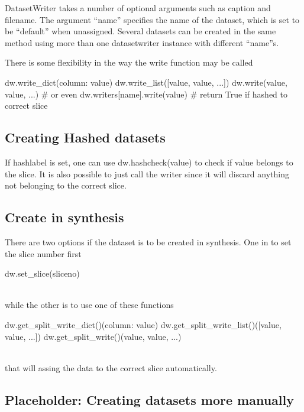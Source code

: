 DatasetWriter takes a number of optional arguments such as caption and
filename.  The argument ``name'' specifies the name of the dataset,
which is set to be ``default'' when unassigned.  Several datasets can
be created in the same method using more than one datasetwriter
instance with different ``name''s.

There is some flexibility in the way the write function may be called

\begin{python}
  dw.write_dict({column: value})
  dw.write_list([value, value, ...])
  dw.write(value, value, ...)
  # or even
  dw.writers[name].write(value)  # return True if hashed to correct slice
\end{python}



\subsection{Creating Hashed datasets}

If hashlabel is set, one can use dw.hashcheck(value) to check if value
belongs to the slice.  It is also possible to just call the writer
since it will discard anything not belonging to the correct slice.



\subsection{Create in synthesis}

There are two options if the dataset is to be created in synthesis.
One in to set the slice number first

\begin{python}
  dw.set_slice(sliceno)
\end{python}
\\
while the other is to use one of these functions

\begin{python}
  dw.get_split_write_dict()({column: value})
  dw.get_split_write_list()([value, value, ...])
  dw.get_split_write()(value, value, ...)
\end{python}
\\
that will assing the data to the correct slice automatically.

\subsection{Placeholder:  Creating datasets more manually}


